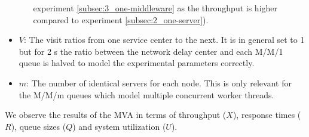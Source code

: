 \begin{itemize}
\begin{itemize}
                                experiment \ref{subsec:3_one-middleware} as the throughput is higher compared to
                                experiment \ref{subsec:2_one-server}).
                      \end{itemize}
                \item $V$: The visit ratios from one service center to the next. It is in general set to 1 but for 2
                      \mw{}s the ratio between the network delay center and each M/M/1 queue is halved to model the
                      experimental parameters correctly.
                \item $m$: The number of identical servers for each node. This is only relevant for the M/M/m queues which
                      model multiple concurrent worker threads.
            \end{itemize}

            We observe the results of the MVA in terms of throughput ($X$), response times ($R$), queue sizes ($Q$) and
            system utilization ($U$).

